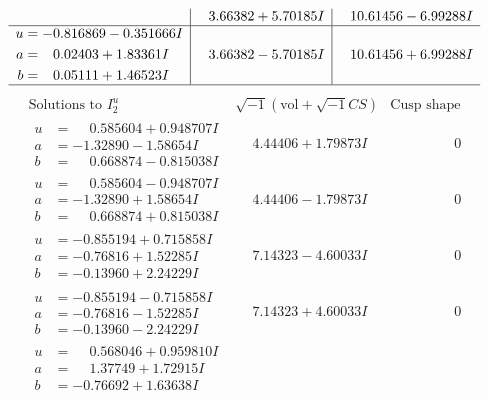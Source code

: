 \documentclass[1p]{elsarticle_modified}
\theoremstyle{definition}
\newcommand{\I}{\sqrt{-1}}
\begin{document}
$$\begin{array}{c|c|c}
 & \phantom{-}3.66382 + 5.70185 I & \phantom{-}10.61456 - 6.99288 I \\ \hline\begin{aligned}
u &= -0.816869 - 0.351666 I \\
a &= \phantom{-}0.02403 + 1.83361 I \\
b &= \phantom{-}0.05111 + 1.46523 I\end{aligned}
 & \phantom{-}3.66382 - 5.70185 I & \phantom{-}10.61456 + 6.99288 I\\
 \hline 
 \end{array}$$\newpage$$\begin{array}{c|c|c}  
\text{Solutions to }I^u_{2}& \I (\text{vol} + \sqrt{-1}CS) & \text{Cusp shape}\\
 \hline 
\begin{aligned}
u &= \phantom{-}0.585604 + 0.948707 I \\
a &= -1.32890 - 1.58654 I \\
b &= \phantom{-}0.668874 - 0.815038 I\end{aligned}
 & \phantom{-}4.44406 + 1.79873 I & \phantom{-0.000000 } 0 \\ \hline\begin{aligned}
u &= \phantom{-}0.585604 - 0.948707 I \\
a &= -1.32890 + 1.58654 I \\
b &= \phantom{-}0.668874 + 0.815038 I\end{aligned}
 & \phantom{-}4.44406 - 1.79873 I & \phantom{-0.000000 } 0 \\ \hline\begin{aligned}
u &= -0.855194 + 0.715858 I \\
a &= -0.76816 + 1.52285 I \\
b &= -0.13960 + 2.24229 I\end{aligned}
 & \phantom{-}7.14323 - 4.60033 I & \phantom{-0.000000 } 0 \\ \hline\begin{aligned}
u &= -0.855194 - 0.715858 I \\
a &= -0.76816 - 1.52285 I \\
b &= -0.13960 - 2.24229 I\end{aligned}
 & \phantom{-}7.14323 + 4.60033 I & \phantom{-0.000000 } 0 \\ \hline\begin{aligned}
u &= \phantom{-}0.568046 + 0.959810 I \\
a &= \phantom{-}1.37749 + 1.72915 I \\
b &= -0.76692 + 1.63638 I\end{aligned}

\end{array}$$
\end{document}
